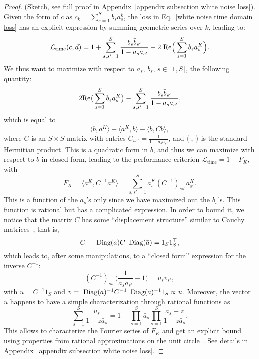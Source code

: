 \begin{proof}(Sketch, see full proof in Appendix~\ref{appendix subsection white noise loss}).
Given the form of $c$ as $c_k = \sum_{s=1}^S b_s a_s^k$, the loss in Eq.~\eqref{white noise time domain loss} has an explicit expression by summing geometric series over $k$, leading to:
\begin{equation}
    \mathcal{L}_\text{time}(c, d)= 1 + \sum_{s, s'=1}^S\frac{b_s\bar{b}_{s'}}{1-a_s\bar{a}_{s'}} - 2{\textnormal{ Re}}\Big(\sum_{s=1}^Sb_sa_s^K\Big).
    \label{good as and bs loss}
\end{equation}
 We thus want to maximize with respect to $a_s$, $b_s$, $s\in\llbracket 1, S\rrbracket$, the following quantity:
\begin{equation*}
 2{\textnormal{Re}}\big(\sum_{s=1}^Sb_sa_s^K\big) - \sum_{s,s'=1}^S\frac{b_s\bar{b}_{s'}}{1-a_s\bar{a}_{s'}},
\end{equation*}
which is equal to 
\begin{equation}
\label{Q}
\langle \bar{b}, a^K\rangle + \langle a^K, \bar{b}\rangle - \langle \bar{b}, C\bar{b}\rangle,
\end{equation}
where $C$ is an $S \times S$ matrix with entries $\displaystyle C_{ss'}=\frac{1}{1-a_s\bar{a}_{s'}}$, and $\langle \cdot,\cdot\rangle$ is the standard Hermitian product. This is a quadratic form in $b$, and thus we can maximize with respect to $b$ in closed form, leading to the performance criterion  $ \mathcal{L}_\text{time} = 1 - F_K$, with 
\begin{equation}
\label{eq:FK}
F_K = \langle a^K, C^{-1}a^K \rangle = \sum_{s,s'=1}^{S} \bar{a}_s^K (C^{-1})_{ss'} a_{s'}^K.
\end{equation}
This is a function of the $a_s$'s only since we have maximized out the $b_s$'s. This function is rational but has a complicated expression.
In order to bound it, we notice that the matrix $C$ has some ``displacement structure'' similar to Cauchy matrices~\citep{yang2003generalized},
that is, 
$$
C - \mathop{\textnormal{ Diag}}( {a}) C \mathop{\textnormal{ Diag}}(\bar{a})  = 1_S 1_S^\top,
$$
which leads to, after some manipulations, to a ``closed form'' expression for the inverse $C^{-1}$:
$$
(C^{-1})_{ss'} \big( \frac{1}{ \bar{a}_s a_{s'}}-1 \big) = u_s \bar{v}_{s'},
$$
with $ u = C^{-1} 1_S$ and $v = \mathop{\textnormal{ Diag}}( \bar{a})^{-1}  C^{-1} \mathop{\textnormal{ Diag}}(a)^{-1} 1_S \propto u$. Moreover, the vector $u$ happens to have a simple characterization through rational functions as
$$
\sum_{s=1}^S \frac{ u_{s}}{1 - z \bar{a}_{s}} = 1 - \prod_{s=1}^S \bar{a}_{s} \prod_{s=1}^S \frac{ a_{s} - z}{1 - z \bar{a}_{s}}.
$$
This allows to characterize the Fourier series of $F_K$ and get an explicit bound using properties from rational approximations on the unit circle~\citep{baratchart2016minimax}. See details in Appendix~\ref{appendix subsection white noise loss}.
\end{proof}


